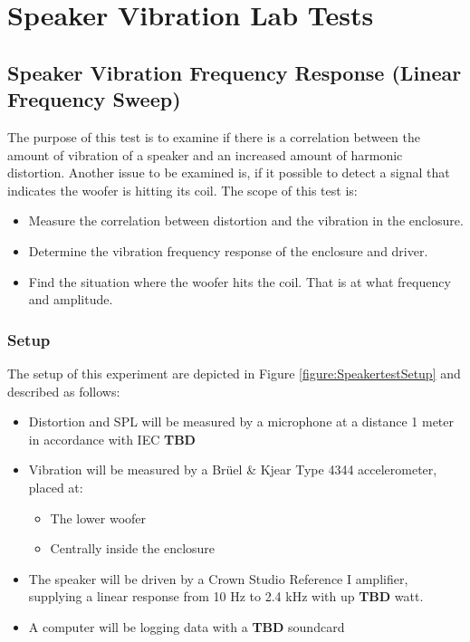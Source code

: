 \chapter{Speaker Vibration Lab Tests} \label{app:journal_speaker_test}

\section{Speaker Vibration Frequency Response (Linear Frequency Sweep)}

The purpose of this test is to examine if there is a correlation between the amount of vibration of a speaker and an increased amount of harmonic distortion. Another issue to be examined is, if it possible to detect a signal that indicates the woofer is hitting its coil. The scope of this test is:



\begin{itemize}
\item Measure the correlation between distortion and the vibration in the enclosure.
\item Determine the vibration frequency response of the enclosure and driver.
\item Find the situation where the woofer hits the coil. That is at what frequency and amplitude.
\end{itemize}

\subsection{Setup}

The setup of this experiment are depicted in Figure \ref{figure:SpeakertestSetup} and described as follows:
\begin{itemize}
\item Distortion and \gls{SPL} will be measured by a microphone at a distance 1 meter in accordance with IEC \textbf{TBD}
\item Vibration will be measured by a Brüel \& Kjear Type 4344 accelerometer, placed at:
\begin{itemize}
\item The lower woofer
\item Centrally inside the enclosure 
\end{itemize}
\item The speaker will be driven by a Crown Studio Reference I amplifier, supplying a linear response from 10 Hz to 2.4 kHz with up \textbf{TBD} watt.
\item A computer will be logging data with a \textbf{TBD} soundcard
\end{itemize}

